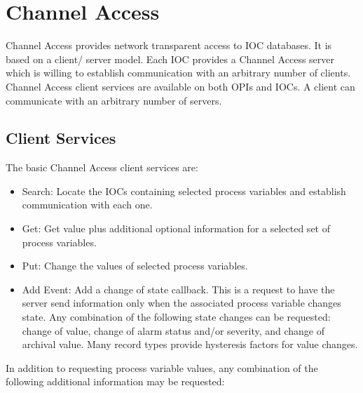 \section{Channel Access}

Channel Access provides network transparent access to IOC databases. It is based on a client/ server model. Each IOC 
provides a Channel Access server which is willing to establish communication with an arbitrary number of clients. 
Channel Access client services are available on both OPIs and IOCs. A client can communicate with an arbitrary number 
of servers.

\subsection{Client Services}

The basic Channel Access client services are:

\begin{itemize}\item Search:  Locate the IOCs containing selected process variables and establish communication with each one.

\item Get:  Get value plus additional optional information for a selected set of process variables.

\item Put:  Change the values of selected process variables.

\item Add Event: Add a change of state callback. This is a request to have the server send information only when the 
associated process variable changes state. Any combination of the following state changes can be requested: 
change of value, change of alarm status and/or severity, and change of archival value. Many record types provide 
hysteresis factors for value changes.

\end{itemize}In addition to requesting process variable values, any combination of the following additional information may be 
requested:

